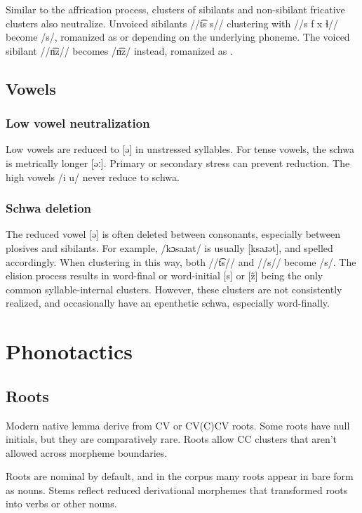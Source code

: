 Similar to the affrication process, clusters of sibilants and non-sibilant fricative clusters also neutralize. Unvoiced sibilants //t͡s s// clustering with //s f x ɬ// become /s/, romanized as  or  depending on the underlying phoneme. The voiced sibilant //n͡z// becomes /n͡z/ instead, romanized as .

\section{Vowels}
\subsection{Low vowel neutralization} \label{sub:schwa_neutral}
Low vowels are reduced to [ə] in unstressed syllables. For tense vowels, the schwa is metrically longer [əː]. Primary or secondary stress can prevent reduction. The high vowels /i u/ never reduce to schwa.

\subsection{Schwa deletion} \label{sub:schwa_delete}
The reduced vowel [ə] is often deleted between consonants, especially between plosives and sibilants. For example,  /kɔsaɹat/ is usually [ksaɹət], and spelled accordingly. When clustering in this way, both //t͡s// and //s// become /s/. The elision process results in word-final or word-initial [s] or [z̃] being the only common syllable-internal clusters. However, these clusters are not consistently realized, and occasionally have an epenthetic schwa, especially word-finally. 

\setchapterpreamble[u]{\margintoc}
\chapter{Phonotactics}
\section{Roots}
Modern native lemma derive from CV or CV(C)CV roots. Some roots have null initials, but they are comparatively rare. Roots allow CC clusters that aren't allowed across morpheme boundaries.

Roots are nominal by default, and in the corpus many roots appear in bare form as nouns. Stems reflect reduced derivational morphemes that transformed roots into verbs or other nouns.

